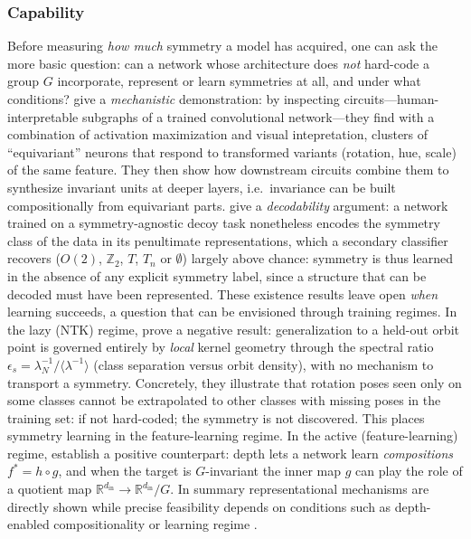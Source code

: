 \documentclass[mathematics,review,submit,moreauthors]{Definitions/mdpi}
\begin{document}
\subsubsection{Capability}
Before measuring \emph{how much} symmetry a model has acquired, one can ask the more basic question: can a network whose architecture does \emph{not} hard-code a group $G$ incorporate, represent or learn symmetries at all, and under what conditions?
\citet{olah2020d} give a \emph{mechanistic} demonstration: by inspecting circuits---human-interpretable subgraphs of a trained convolutional network---they find with a combination of activation maximization and visual intepretation, clusters of ``equivariant'' neurons that respond to transformed variants (rotation, hue, scale) of the same feature.
They then show how downstream circuits combine them to synthesize invariant units at deeper layers, i.e.\ invariance can be built compositionally from equivariant parts.
\citet{barenboim2021sp} give a \emph{decodability} argument: a network trained on a symmetry-agnostic decoy task nonetheless encodes the symmetry class of the data in its penultimate representations, which a secondary classifier recovers ($O(2)$, $\mathbb{Z}_2$, $T$, $T_n$ or $\emptyset$) largely above chance: symmetry is thus learned in the absence of any explicit symmetry label, since a structure that can be decoded must have been represented.\newline
These existence results leave open \emph{when} learning succeeds, a question that can be envisioned through training regimes.
In the lazy (NTK) regime, \citet{perin2025} prove a negative result: generalization to a held-out orbit point is governed entirely by \emph{local} kernel geometry through the spectral ratio $\epsilon_s = \lambda_N^{-1}/\langle\lambda^{-1}\rangle$ (class separation versus orbit density), with no mechanism to transport a symmetry.
Concretely, they illustrate that rotation poses seen only on some classes cannot be extrapolated to other classes with missing poses in the training set: if not hard-coded; the symmetry is not discovered.
This places symmetry learning in the feature-learning regime.
In the active (feature-learning) regime, \citet{jacot2025} establish a positive counterpart: depth lets a network learn \emph{compositions} $f^\ast = h \circ g$, and when the target is $G$-invariant the inner map $g$ can play the role of a quotient map $\mathbb{R}^{d_{\mathrm{in}}} \to \mathbb{R}^{d_{\mathrm{in}}}/G$.
In summary representational mechanisms are directly shown \citep{olah2020d,barenboim2021sp} while precise feasibility depends on conditions such as depth-enabled compositionality or learning regime \citep{perin2025,jacot2025}.
\end{document}
